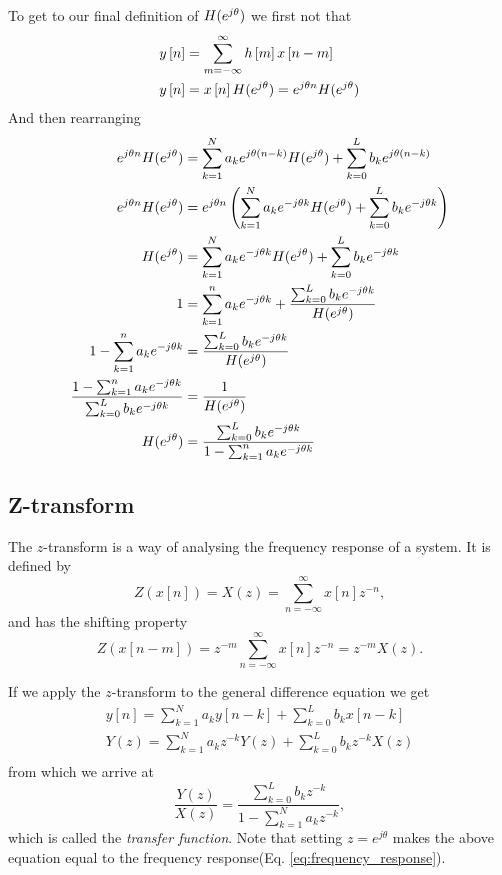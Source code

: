 \documentclass{article}
\def\lsqb{\left[}
\def\rsqb{\right]}
\def\sqb#1{\lsqb #1 \rsqb}
\def\xsig{x\sqb{n}}
\def\ysig{y\sqb{n}}
\begin{document}
To get to our final definition of $H(e^{j\theta})$ we first not that
\begin{align}
    \ysig &= \convsum h\sqb{m} x\sqb{n-m} \\
    \ysig &= \xsig \hfun = e^{j\theta n} \hfun
\end{align}
And then rearranging
\begin{align}
    e^{j\theta n} H(e^{j\theta}) &= \sum_{k=1}^{N} a_k e^{j\theta (n-k)} H(e^{j\theta}) + \sum_{k=0}^{L} b_k e^{j\theta(n-k)} \\
    e^{j\theta n} H(e^{j\theta}) &= e^{j\theta n} \left( \sum_{k=1}^{N} a_k e^{-j\theta k} H(e^{j\theta}) + \sum_{k=0}^{L} b_k e^{-j\theta k} \right)\\
    H(e^{j\theta}) &= \sum_{k=1}^{N} a_k e^{-j\theta k} H(e^{j\theta}) + \sum_{k=0}^{L} b_k e^{-j\theta k} \\
    1 &= \sum_{k=1}^{n} a_k e^{-j\theta k} + \frac{\sum_{k=0}^{L} b_k e^{-j\theta k}}{H(e^{j\theta})} \\
    1 - \sum_{k=1}^{n} a_k e^{-j\theta k} &= \frac{\sum_{k=0}^{L} b_k e^{-j\theta k}}{H(e^{j\theta})} \\
    \frac{1 - \sum_{k=1}^{n} a_k e^{-j\theta k}}{\sum_{k=0}^{L} b_k e^{-j\theta k}} &= \frac{1}{H(e^{j\theta})}\\
    H(e^{j\theta}) &= \frac{\sum_{k=0}^{L} b_k e^{-j\theta k}}{1 - \sum_{k=1}^{n} a_k e^{-j\theta k}} \label{eq:frequency_response}
\end{align}

\subsection{Z-transform}
The $z$-transform is a way of analysing the frequency response of a system. It is defined by
\begin{equation}
    Z(\xsig) = X(z) = \sum_{n=-\infty}^{\infty} \xsig z^{-n},
\end{equation}
and has the shifting property
\begin{equation}
    Z(x\sqb{n-m}) = z^{-m} \sum_{n=-\infty}^{\infty} x\sqb{n} z^{-n} = z^{-m} X(z).
\end{equation}

If we apply the $z$-transform to the general difference equation we get
\begin{align}
    \ysig = \sum_{k=1}^N a_k y\sqb{n-k} + \sum_{k=0}^L b_k x\sqb{n-k} \\
    Y(z) = \sum_{k=1}^N a_k z^{-k} Y(z) + \sum_{k=0}^L b_k z^{-k} X(z) \\
\end{align}
from which we arrive at
\begin{equation}
    \label{eq:ztransform}
    \frac{Y(z)}{X(z)} = \frac{\sum_{k=0}^L b_k z^{-k}}{1 - \sum_{k=1}^N a_k z^{-k}},
\end{equation}
which is called the \textit{transfer function}. Note that setting $z = e^{j\theta}$ makes the above equation equal to the frequency response(Eq. \ref{eq:frequency_response}).
\end{document}
